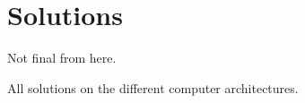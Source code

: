 \chapter{Solutions}

Not final from here.

All solutions on the different computer architectures.



